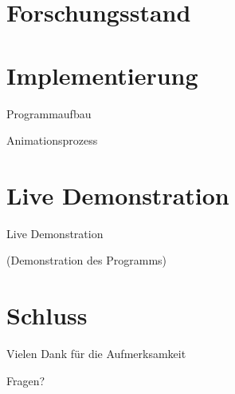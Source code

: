\documentclass[t,aspectratio=169,divpsnames]{beamer}
\begin{document}
\section{Forschungsstand}

\section{Implementierung}

\begin{frame}{Programmaufbau}
\end{frame}

\begin{frame}{Animationsprozess}

\end{frame}

\section{Live Demonstration}
\begin{frame}{Live Demonstration}
    \begin{center}
        \huge{(Demonstration des Programms)}
    \end{center}
\end{frame}

\section*{Schluss}
\begin{frame}
    \begin{center}
        \huge{Vielen Dank für die Aufmerksamkeit}
    \end{center}
    \begin{center}
        \Huge{Fragen?}
    \end{center}
\end{frame}

\begin{frame}[allowframebreaks]{\bibname}
\end{frame}
\end{document}

